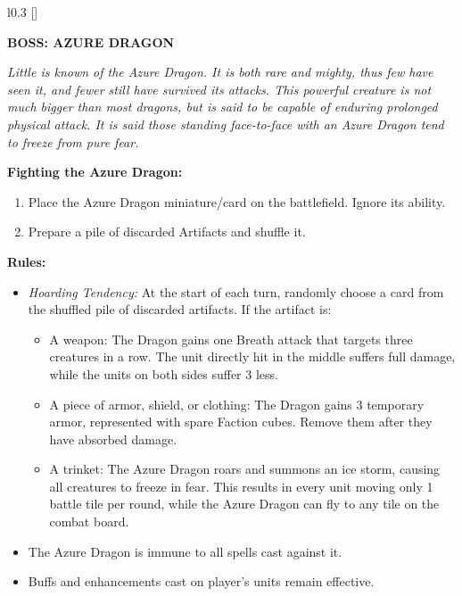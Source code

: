 \begin{wrapfigure}{l}{0.3\textwidth}
  \raisebox{0pt}[\dimexpr{}\baselineskip\relax]{}
\end{wrapfigure}
{
  \textbf{\MakeUppercase{Boss: Azure Dragon}}

  \medskip

  \textit{Little is known of the Azure Dragon.
    It is both rare and mighty, thus few have seen it, and fewer still have survived its attacks.
    This powerful creature is not much bigger than most dragons, but is said to be capable of enduring prolonged physical attack.
    It is said those standing face-to-face with an Azure Dragon tend to freeze from pure fear.
  }

  \medskip

  \textbf{Fighting the Azure Dragon:}
  \begin{enumerate}
    \item Place the Azure Dragon miniature/card on the battlefield.
      Ignore its ability.
    \item Prepare a pile of discarded Artifacts and shuffle it.
  \end{enumerate}

  \medskip

  \textbf{Rules:}
  \begin{itemize}
    \item \textit{Hoarding Tendency:} At the start of each turn, randomly choose a card from the shuffled pile of discarded artifacts.
      If the artifact is:
      \begin{itemize}[leftmargin=15pt]
        \item A weapon: The Dragon gains one Breath attack that targets three creatures in a row.
          The unit directly hit in the middle suffers full damage, while the units on both sides suffer 3  less.
        \item A piece of armor, shield, or clothing: The Dragon gains 3 temporary armor, represented with spare Faction cubes.
          Remove them after they have absorbed damage.
        \item A trinket: The Azure Dragon roars and summons an ice storm, causing all creatures to freeze in fear.
          This results in every unit moving only 1 battle tile per round, while the Azure Dragon can fly to any tile on the combat board.
      \end{itemize}
    \item The Azure Dragon is immune to all spells cast against it.
    \item Buffs and enhancements cast on player's units remain effective.
  \end{itemize}
}

